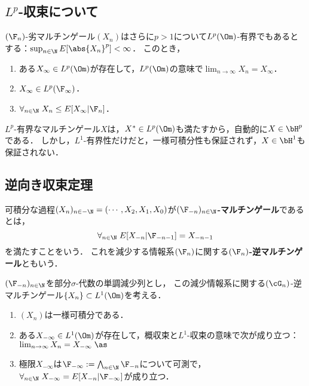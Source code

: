 \documentclass[uplatex,dvipdfmx]{jsreport}
\begin{document}
\subsection{$L^p$-収束について}

\begin{proposition}
    $(\F_n)$-劣マルチンゲール$(X_n)$はさらに$p>1$について$L^p(\Om)$-有界でもあるとする：$\sup_{n\in\N}E[\abs{X_n}^p]<\infty$．
    このとき，
    \begin{enumerate}
        \item ある$X_\infty\in L^p(\Om)$が存在して，$L^p(\Om)$の意味で$\lim_{n\to\infty}X_n=X_\infty$．
        \item $X_\infty\in L^p(\F_\infty)$．
        \item $\forall_{n\in\N}\;X_n\le E[X_\infty|\F_n]$．
    \end{enumerate}
\end{proposition}

\begin{remarks}
    $L^p$-有界なマルチンゲール$X$は，$X^*\in L^p(\Om)$も満たすから，自動的に$X\in\bH^p$である．
    しかし，$L^1$-有界性だけだと，一様可積分性も保証されず，$X\in\bH^1$も保証されない．
\end{remarks}

\subsection{逆向き収束定理}

\begin{definition}
    可積分な過程$(X_n)_{n\in-\N}=(\cdots,X_2,X_1,X_0)$が\textbf{$(\F_{-n})_{n\in\N}$-マルチンゲール}であるとは，
    \[\forall_{n\in\N}\;E[X_{-n}|\F_{-n-1}]= X_{-n-1}\]
    を満たすことをいう．
    これを減少する情報系$(\F_n)$に関する\textbf{$(\F_n)$-逆マルチンゲール}ともいう．
\end{definition}

\begin{theorem}
    $(\F_{-n})_{n\in\N}$を部分$\sigma$-代数の単調減少列とし，
    この減少情報系に関する$(\cG_n)$-逆マルチンゲール$\{X_n\}\subset L^1(\Om)$を考える．
    \begin{enumerate}
        \item $(X_n)$は一様可積分である．
        \item ある$X_{-\infty}\in L^1(\Om)$が存在して，概収束と$L^1$-収束の意味で次が成り立つ：$\lim_{n\to\infty}X_n=X_{-\infty}\;\as$
        \item 極限$X_{-\infty}$は$\F_{-\infty}:=\bigwedge_{n\in\N}\F_{-n}$について可測で，$\forall_{n\in\N}\;X_{-\infty}=E[X_{-n}|\F_{-\infty}]$が成り立つ．
    \end{enumerate}
\end{theorem}
\end{document}
